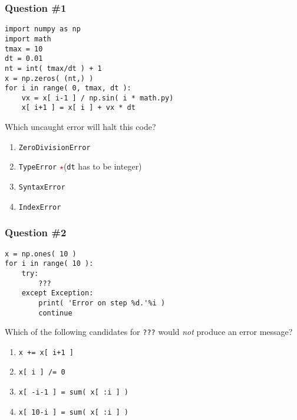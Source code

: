 \documentclass[11pt]{beamer}
\newcommand{\correctstar}{{\Large\textcolor{red}{$\star$}}}
\begin{document}
\begin{frame}[fragile]
  \frametitle{Question \#1}
  \Enlarge

  \begin{Verbatim}
import numpy as np
import math
tmax = 10
dt = 0.01
nt = int( tmax/dt ) + 1
x = np.zeros( (nt,) )
for i in range( 0, tmax, dt ):
    vx = x[ i-1 ] / np.sin( i * math.py)
    x[ i+1 ] = x[ i ] + vx * dt
  \end{Verbatim}

Which uncaught error will halt this code?

  \begin{enumerate}[label=\Alph*]
    \item  \texttt{ZeroDivisionError}
    \item  \texttt{TypeError}  \correctstar  (\texttt{dt} has to be integer)
    \item  \texttt{SyntaxError}
    \item  \texttt{IndexError}
  \end{enumerate}
\end{frame}

\begin{frame}[fragile]
  \frametitle{Question \#2}
  \Enlarge

  \begin{Verbatim}
x = np.ones( 10 )
for i in range( 10 ):
    try:
        ???
    except Exception:
        print( 'Error on step %d.'%i )
        continue
  \end{Verbatim}

Which of the following candidates for \texttt{???} would \emph{not} produce an error message?

  \begin{enumerate}[label=\Alph*]
    \item  \texttt{x += x[ i+1 ]}
    \item  \texttt{x[ i ] /= 0}
    \item  \texttt{x[ -i-1 ]   = sum( x[ :i ] )}
    \item  \texttt{x[ 10-i ] = sum( x[ :i ] )}
  \end{enumerate}
\end{frame}
\end{document}
